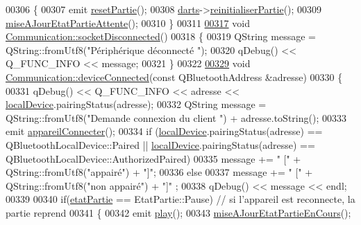 \begin{DoxyCode}
00306 \{
00307     emit \hyperlink{class_communication_af79d126304cca4281db4624b1b457ade}{resetPartie}();
00308     \hyperlink{class_communication_a494d609c206472041468e362d7cfc0e5}{darts}->\hyperlink{class_darts_a70c68ed8bd56b63df203c25e6ed14f3b}{reinitialiserPartie}();
00309     \hyperlink{class_communication_a72557be8ab858096e03f08e78e036aeb}{miseAJourEtatPartieAttente}();
00310 \}
00311 
\hyperlink{class_communication_a44f863f2c70f4be652224240447c9fe0}{00317} \textcolor{keywordtype}{void} \hyperlink{class_communication_a44f863f2c70f4be652224240447c9fe0}{Communication::socketDisconnected}()
00318 \{
00319     QString message = QString::fromUtf8(\textcolor{stringliteral}{"Périphérique déconnecté "});
00320     qDebug() << Q\_FUNC\_INFO << message;
00321 \}
00322 
\hyperlink{class_communication_a33db5c9db5da71c20c8c544d1de4eb9a}{00329} \textcolor{keywordtype}{void} \hyperlink{class_communication_a33db5c9db5da71c20c8c544d1de4eb9a}{Communication::deviceConnected}(\textcolor{keyword}{const} QBluetoothAddress &adresse)
00330 \{
00331     qDebug() << Q\_FUNC\_INFO << adresse << \hyperlink{class_communication_a6281796eab7523bef6be1a766e0e906f}{localDevice}.pairingStatus(adresse);
00332     QString message = QString::fromUtf8(\textcolor{stringliteral}{"Demande connexion du client "}) + adresse.toString();
00333     emit \hyperlink{class_communication_ae05ddbb1481cfb64f493940b6db8ed29}{appareilConnecter}();
00334     \textcolor{keywordflow}{if} (\hyperlink{class_communication_a6281796eab7523bef6be1a766e0e906f}{localDevice}.pairingStatus(adresse) == QBluetoothLocalDevice::Paired || 
      \hyperlink{class_communication_a6281796eab7523bef6be1a766e0e906f}{localDevice}.pairingStatus(adresse) == QBluetoothLocalDevice::AuthorizedPaired)
00335         message += \textcolor{stringliteral}{" ["} + QString::fromUtf8(\textcolor{stringliteral}{"appairé"}) + \textcolor{stringliteral}{"]"};
00336     \textcolor{keywordflow}{else}
00337         message += \textcolor{stringliteral}{" ["} + QString::fromUtf8(\textcolor{stringliteral}{"non appairé"}) + \textcolor{stringliteral}{"]"} ;
00338     qDebug() << message << endl;
00339 
00340     \textcolor{keywordflow}{if}(\hyperlink{class_communication_a2539ded2780db2c732690c585c768c96}{etatPartie} == EtatPartie::Pause) \textcolor{comment}{// si l'appareil est reconnecte, la partie reprend}
00341     \{
00342         emit \hyperlink{class_communication_a2645730b88adec069200debe05d212c3}{play}();
00343         \hyperlink{class_communication_a1f90de1ff5f98de887b9c77664e105c7}{miseAJourEtatPartieEnCours}();

\end{DoxyCode}
